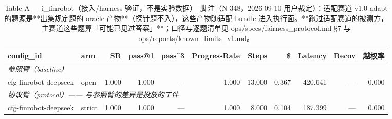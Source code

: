\begin{table}[t]
\centering
\caption{Table A — i\_finrobot（接入/harness 验证，不是实验数据）　脚注（N-348，2026-09-10 用户裁定）：适配赛道 v1.0-adapt 的题源是**出集规定题的 oracle 产物**（探针题不入），这些产物随适配 bundle 进入执行面。**跑过适配赛道的被测方，主赛道这些题算「可能已见过答案」**；口径与逐题清单见 ops/specs/fairness\_protocol.md §7 与 ops/reports/known\_limits\_v1.md。}
\label{tab:a-i_finrobot}
\begin{tabular}{llrrrrrrrrr}
\toprule
config\_id & arm & SR & pass@1 & pass\^{}3 & ProgressRate & Steps & \$ & Latency & Recov & 越权率 \\
\midrule
\multicolumn{11}{l}{\textit{参照臂（baseline）}} \\
cfg-finrobot-deepseek & open & 1.000 & 1.000 & --- & 1.000 & 13.000 & 0.367 & 420.641 & --- & 0.000 \\
\midrule
\multicolumn{11}{l}{\textit{协议臂（protocol）—— 与参照臂的差异是投放的工件}} \\
cfg-finrobot-deepseek & strict & 1.000 & 1.000 & --- & 1.000 & 8.000 & 0.104 & 187.399 & --- & 0.000 \\
\bottomrule
\end{tabular}
\end{table}

